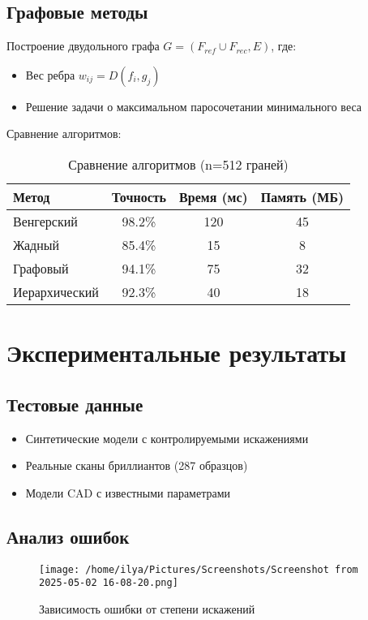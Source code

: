 \documentclass[a4paper,12pt]{article}
\begin{document}
\subsection{Графовые методы}
Построение двудольного графа $G=(F_{ref} \cup F_{rec}, E)$, где:
\begin{itemize}
    \item Вес ребра $w_{ij} = D(f_i, g_j)$
    \item Решение задачи о максимальном паросочетании минимального веса
\end{itemize}

Сравнение алгоритмов:
\begin{table}[H]
\centering
\begin{tabular}{@{}lccc@{}}
\toprule
Метод & Точность & Время (мс) & Память (МБ) \\ \midrule
Венгерский & 98.2\% & 120 & 45 \\
Жадный & 85.4\% & 15 & 8 \\
Графовый & 94.1\% & 75 & 32 \\
Иерархический & 92.3\% & 40 & 18 \\ \bottomrule
\end{tabular}
\caption{Сравнение алгоритмов (n=512 граней)}
\end{table}

\section{Экспериментальные результаты}
\subsection{Тестовые данные}
\begin{itemize}
    \item Синтетические модели с контролируемыми искажениями
    \item Реальные сканы бриллиантов (287 образцов)
    \item Модели CAD с известными параметрами
\end{itemize}

\subsection{Анализ ошибок}
\begin{figure}[H]
\centering
\texttt{[image: /home/ilya/Pictures/Screenshots/Screenshot from 2025-05-02 16-08-20.png]}
\caption{Зависимость ошибки от степени искажений}
\label{fig:errors}
\end{figure}
\end{document}
